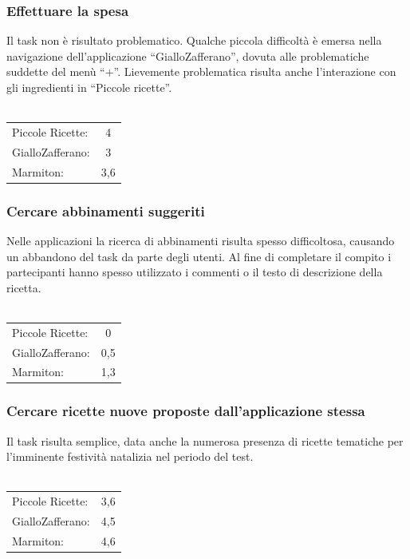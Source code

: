 \subsubsection{Effettuare la spesa}
Il task non è risultato problematico.  Qualche piccola difficoltà è emersa nella navigazione
dell'applicazione ``GialloZafferano'', dovuta alle problematiche suddette del menù ``+''.
Lievemente problematica risulta anche l'interazione con gli ingredienti in ``Piccole
ricette''.\\\\
\begin{tabular}{l c}
Piccole Ricette: & 4\\
GialloZafferano: & 3\\
Marmiton: & 3,6\\
\end{tabular}

\subsubsection{Cercare abbinamenti suggeriti}
Nelle applicazioni la ricerca di abbinamenti risulta spesso difficoltosa, causando
un abbandono del task da parte degli utenti. 
Al fine di completare il compito i partecipanti hanno spesso utilizzato i commenti o
il testo di descrizione della ricetta.\\\\
\begin{tabular}{l c}
Piccole Ricette: & 0\\
GialloZafferano: & 0,5\\
Marmiton: & 1,3\\
\end{tabular}

\subsubsection{Cercare ricette nuove proposte dall'applicazione stessa}
Il task risulta semplice, data anche la numerosa presenza di ricette tematiche
per l'imminente festività natalizia nel periodo del test.\\\\
\begin{tabular}{l c}
Piccole Ricette: & 3,6\\
GialloZafferano: & 4,5\\
Marmiton: & 4,6\\
\end{tabular}

